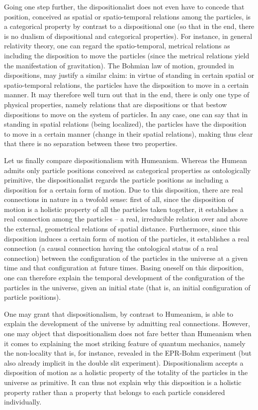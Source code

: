 \documentclass[12pt]{article}
\theoremstyle{definition}
\begin{document}
Going one step further, the dispositionalist does not even have to concede that position, conceived as spatial or spatio-temporal relations among the particles, is a categorical property by contrast to a dispositional one (so that in the end, there is no dualism of dispositional and categorical properties). For instance, in general relativity theory, one can regard the spatio-temporal, metrical relations as including the disposition to move the particles (since the metrical relations yield the manifestation of gravitation). The Bohmian law of motion, grounded in dispositions, may justify a similar claim: in virtue of standing in certain spatial or spatio-temporal relations, the particles have the disposition to move in a certain manner. It may therefore well turn out that in the end, there is only one type of physical properties, namely relations that are dispositions or that bestow dispositions to move on the system of particles. In any case, one can say that in standing in spatial relations (being localized), the particles have the disposition to move in a certain manner (change in their spatial relations), making thus clear that there is no separation between these two properties.

Let us finally compare dispositionalism with Humeanism. Whereas the Humean admits only particle positions conceived as categorical properties as ontologically primitive, the dispositionalist regards the particle positions as including a disposition for a certain form of motion. Due to this disposition, there are real connections in nature in a twofold sense: first of all, since the disposition of motion is a holistic property of all the particles taken together, it establishes a real connection among the particles -- a real, irreducible relation over and above the external, geometrical relations of spatial distance. Furthermore, since this disposition induces a certain form of motion of the particles, it establishes a real connection (a causal connection having the ontological status of a real connection) between the configuration of the particles in the universe at a given time and that configuration at future times. Basing oneself on this disposition, one can therefore explain the temporal development of the configuration of the particles in the universe, given an initial state (that is, an initial configuration of particle positions).

One may grant that dispositionalism, by contrast to Humeanism, is able to explain the development of the universe by admitting real connections. However, one may object that dispositionalism does not fare better than Humeanism when it comes to explaining the most striking feature of quantum mechanics, namely the non-locality that is, for instance, revealed in the EPR-Bohm experiment (but also already implicit in the double slit experiment). Dispositionalism accepts a disposition of motion as a holistic property of the totality of the particles in the universe as primitive. It can thus not explain why this disposition is a holistic property rather than a property that belongs to each particle considered individually.
\end{document}
